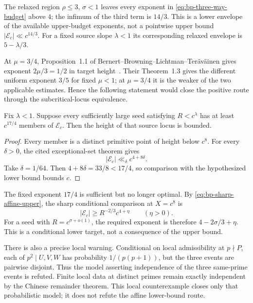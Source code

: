 The relaxed region $\rho\leq3$, $\sigma<1$ leaves every exponent in
\eqref{eq:bp-three-way-budget} above $4$; the infimum of the third term is
$14/3$.  This is a lower envelope of the available upper-budget exponents,
not a pointwise upper bound $|\mathcal E_c|\ll c^{14/3}$.  For a fixed
source slope $\lambda<1$ its corresponding relaxed envelope is
$5-\lambda/3$.

At $\mu=3/4$, Proposition~1.1 of
Bernert--Browning--Lichtman--Ter\"av\"ainen gives exponent
$2\mu/3=1/2$ in target height~\cite{BBLT}.  Their Theorem~1.3 gives the
different uniform exponent $3/5$ for fixed $\mu<1$; at $\mu=3/4$ it is the
weaker of the two applicable estimates.  Hence the following statement would
close the positive route through the subcritical-locus equivalence.

\begin{corollary}
\label{cor:bp-affine-closing-step}
Fix $\lambda<1$.  Suppose every sufficiently large seed satisfying
$R<c^\lambda$ has at least $c^{17/4}$ members of $\mathcal E_c$.  Then the
height of that source locus is bounded.
\end{corollary}

\begin{proof}
Every member is a distinct primitive point of height below $c^8$.  For every
$\delta>0$, the cited exceptional-set theorem gives
\[
                         |\mathcal E_c|\ll_\delta c^{4+8\delta}.
\]
Take $\delta=1/64$.  Then $4+8\delta=33/8<17/4$, so comparison with the
hypothesized lower bound bounds $c$.
\end{proof}

The fixed exponent $17/4$ is sufficient but no longer optimal.  By
\eqref{eq:bp-sharp-affine-upper}, the sharp conditional comparison at
$X=c^8$ is
\[
              |\mathcal E_c|\geq R^{-2/3}c^{4+\eta}
              \qquad(\eta>0).
\]
For a seed with $R=c^{\sigma+o(1)}$, the required exponent is therefore
$4-2\sigma/3+\eta$.  This is a conditional lower target, not a consequence of
the upper bound.

There is also a precise local warning.  Conditional on local admissibility at
$p\nmid P$, each of $p^2\mid U,V,W$ has probability $1/(p(p+1))$, but the
three events are pairwise disjoint.  Thus the model asserting independence of
the three same-prime events is refuted.  Finite local data at distinct primes
remain exactly independent by the Chinese remainder theorem.  This local
counterexample closes only that probabilistic model; it does not refute the
affine lower-bound route.

